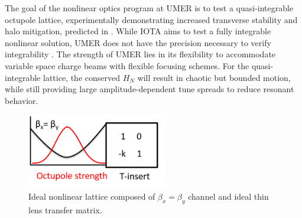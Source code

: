 The goal of the nonlinear optics program at UMER is to test a quasi-integrable octupole lattice, experimentally demonstrating increased transverse stability and halo mitigation, predicted in \cite{Webb}. While IOTA aims to test a fully integrable nonlinear solution, UMER does not have the precision necessary to verify integrability \cite{ipac12}. The strength of UMER lies in its flexibility to accommodate variable space charge beams with flexible focusing schemes. For the quasi-integrable lattice, the conserved $H_N$ will result in chaotic but bounded motion, while still providing large amplitude-dependent tune spreads to reduce resonant behavior.


\begin{figure}[!htb]
   \centering
   \includegraphics*[width=174pt]{1.figures/toy_model}
   \caption{Ideal nonlinear lattice composed of $\beta_x = \beta_y$ channel and ideal thin lens transfer matrix.}
   \label{iota}
\end{figure}

